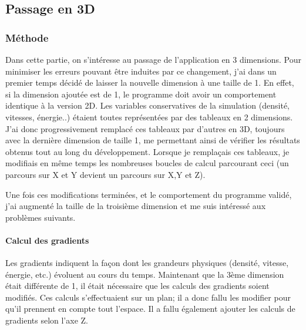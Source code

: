 \subsection{Passage en 3D}

\subsubsection{Méthode}\label{sec:3dmeth}
Dans cette partie, on s'intéresse au passage de l'application en 3 dimensions. Pour minimiser les erreurs pouvant être induites par ce changement, j'ai dans un premier temps décidé de laisser la nouvelle dimension à une taille de 1. En effet, si la dimension ajoutée est de 1, le programme doit avoir un comportement identique à la version 2D. Les variables conservatives de la simulation (densité, vitesses, énergie..) étaient toutes représentées par des tableaux en 2 dimensions. J'ai donc progressivement remplacé ces tableaux par d'autres en 3D, toujours avec la dernière dimension de taille 1,  me permettant ainsi de vérifier les résultats obtenus tout au long du développement. Lorsque je remplaçais ces tableaux, je modifiais en même temps les nombreuses boucles de calcul parcourant ceci (un parcours sur X et Y devient un parcours sur X,Y et Z). 

Une fois ces modifications terminées, et le comportement du programme validé, j'ai augmenté la taille de la troisième dimension et me suis intéressé aux problèmes suivants.




\paragraph{Calcul des gradients}Les gradients indiquent la façon dont les grandeurs physiques (densité, vitesse, énergie, etc.) évoluent au cours du temps. Maintenant que la 3ème dimension était différente de 1, il était nécessaire que les calculs des gradients soient modifiés. Ces calculs s'effectuaient sur un plan; il a donc fallu les modifier pour qu'il prennent en compte tout l'espace. Il a fallu également ajouter les calculs de gradients selon l'axe Z.


